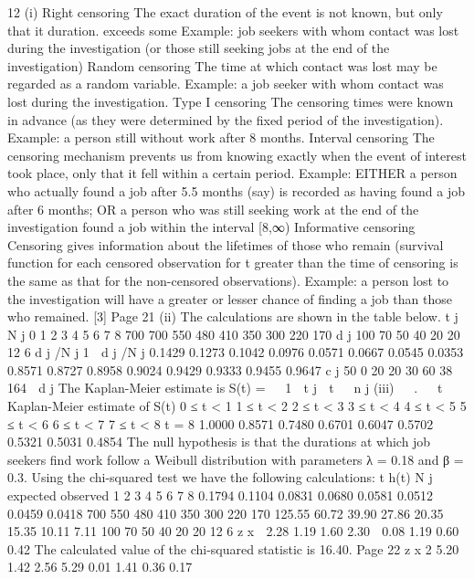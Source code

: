 \documentclass[a4paper,12pt]{article}
\begin{document}
\begin{enumerate}
12
(i)
Right censoring
The exact duration of the event is not known, but only that it
duration.
exceeds some
Example: job seekers with whom contact was lost during the investigation (or
those still seeking jobs at the end of the investigation)
Random censoring
The time at which contact was lost may be regarded as a random variable.
Example: a job seeker with whom contact was lost during the investigation.
Type I censoring
The censoring times were known in advance (as they were determined by the
fixed period of the investigation).
Example: a person still without work after 8 months.
Interval censoring
The censoring mechanism prevents us from knowing exactly when the event
of interest took place, only that it fell within a certain period.
Example: EITHER a person who actually found a job after 5.5 months (say) is
recorded as having found a job after 6 months;
OR a person who was still seeking work at the end of the investigation found a
job within the interval [8,∞)
Informative censoring
Censoring gives information about the lifetimes of those who remain (survival
function for each censored observation for t greater than the time of censoring
is the same as that for the non-censored observations).
Example: a person lost to the investigation will have a greater or lesser chance
of finding a job than those who remained.
[3]
Page 21 %
(ii)
The calculations are shown in the table below.
t j N j
0
1
2
3
4
5
6
7
8 700
700
550
480
410
350
300
220
170
d j
100
70
50
40
20
20
12
6
d j /N j 1  d j /N j
0.1429
0.1273
0.1042
0.0976
0.0571
0.0667
0.0545
0.0353 0.8571
0.8727
0.8958
0.9024
0.9429
0.9333
0.9455
0.9647
c j
50
0
20
20
30
60
38
164
 d j
The Kaplan-Meier estimate is S(t) =   1 
t j  t 
 n j
(iii)

 .


t Kaplan-Meier estimate of S(t)
0 ≤ t < 1
1 ≤ t < 2
2 ≤ t < 3
3 ≤ t < 4
4 ≤ t < 5
5 ≤ t < 6
6 ≤ t < 7
7 ≤ t < 8
t = 8 1.0000
0.8571
0.7480
0.6701
0.6047
0.5702
0.5321
0.5031
0.4854
The null hypothesis is that the durations at which job seekers find
work follow a Weibull distribution with parameters λ = 0.18 and β = 0.3.
Using the chi-squared test we have the following calculations:
t h(t) N j expected observed
1
2
3
4
5
6
7
8 0.1794
0.1104
0.0831
0.0680
0.0581
0.0512
0.0459
0.0418 700
550
480
410
350
300
220
170 125.55
60.72
39.90
27.86
20.35
15.35
10.11
7.11 100
70
50
40
20
20
12
6
z x
 2.28
1.19
1.60
2.30
 0.08
1.19
0.60
 0.42
The calculated value of the chi-squared statistic is 16.40.
Page 22
z x 2
5.20
1.42
2.56
5.29
0.01
1.41
0.36
0.17 %

\end{enumerate}
\end{document}
